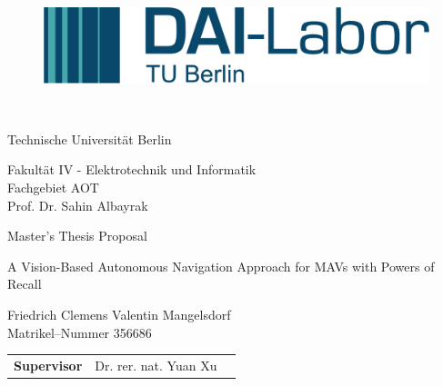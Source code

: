 \thispagestyle{empty}
\begin{figure}[htbp]
	\centering
 \begin{minipage}[b]{41 mm}
   \includegraphics[width=40 mm]{figures/DAI_Logo.png}
 \end{minipage}
\end{figure}

~\vspace{0.5cm}

\begin{center}
\begin{Huge}
Technische Universit\"at Berlin\\
\vspace{1mm}
\end{Huge}{\Large Fakult\"at IV - Elektrotechnik und Informatik\\
Fachgebiet AOT\\
Prof. Dr. Sahin Albayrak}\\

\vspace{26mm}
\begin{LARGE}
Master's Thesis Proposal\\
\end{LARGE}
\vspace{8mm}
\begin{LARGE}
A Vision-Based Autonomous Navigation Approach for MAVs with Powers of Recall\\
\end{LARGE}
\vspace{3 cm}
Friedrich Clemens Valentin Mangelsdorf\\
Matrikel--Nummer 356686\\
\vspace{1cm}
\begin{tabular}{lll}
\textbf{Supervisor} & Dr. rer. nat. Yuan Xu \\%
\end{tabular}

\end{center}

